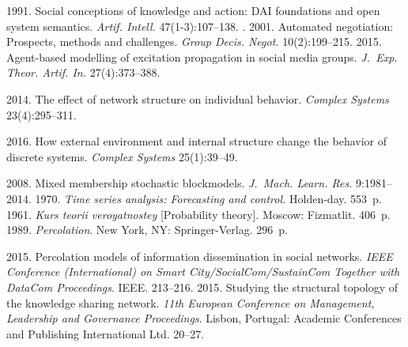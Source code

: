   \begin{multicols}{2}

\renewcommand{\bibname}{\protect\rmfamily References}

{\small\frenchspacing
 {%
 \begin{thebibliography}{99}

 1991. Social conceptions of knowledge and action: DAI foundations and open 
system semantics. \textit{Artif. Intell.} 47(1-3):107--138.
. 
2001. Automated negotiation: Prospects, methods and challenges. \textit{Group Decis. 
Negot.} 10(2):199--215.
 2015. Agent-based modelling of excitation 
propagation in social media groups. \textit{J.~Exp. Theor. Artif. In.} 
27(4):373--388.

 2014. The effect of network structure on individual behavior. 
\textit{Complex Systems} 23(4):295--311.

 2016. How external environment and internal structure change the 
behavior of discrete systems. \textit{Complex Systems} 25(1):39--49.

 2008. Mixed membership 
stochastic blockmodels. \textit{J.~Mach. Learn. Res.} 9:1981--2014.
 1970. \textit{Time series analysis: Forecasting and 
control.} Holden-day. 553~p.
 1961. \textit{Kurs teorii veroyatnostey} [Probability theory]. Moscow: Fizmatlit. 406~p.
 1989. \textit{Percolation}. New York, NY: Springer-Verlag. 296~p.

 2015. Percolation models of information dissemination in 
social networks. \textit{IEEE Conference (International) on Smart City/SocialCom/\linebreak SustainCom 
Together with DataCom Proceedings}. IEEE. 213--216.
 2015. Studying the structural topology 
of the knowledge sharing network. \textit{11th European Conference on Management, Leadership 
and Governance Proceedings}. Lisbon, Portugal: Academic Conferences and Publishing 
International Ltd. 20--27.


\end{thebibliography}}}
\end{multicols}
